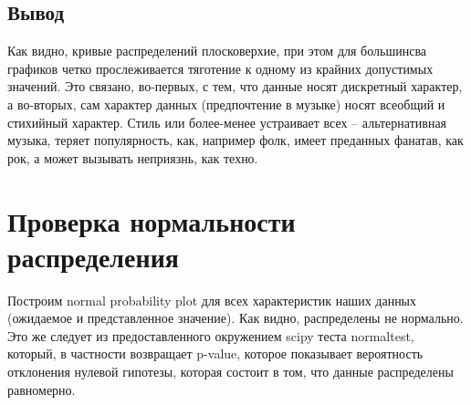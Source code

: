 \documentclass[11pt]{article}
\begin{document}
\subsection{Вывод}
Как видно, кривые распределений плосковерхие, при этом для большинсва графиков четко прослеживается 
тяготение к одному из крайних допустимых значений. Это связано, во-первых, с тем, что данные носят дискретный
характер, а во-вторых, сам характер данных (предпочтение в музыке) носят всеобщий и стихийный характер. Стиль или более-менее устраивает всех -- альтернативная музыка, теряет популярность, как, например фолк, имеет преданных фанатав, как рок,
а может вызывать неприязнь, как техно. 

\section{Проверка нормальности распределения}
Построим normal probability plot для всех характеристик наших данных (ожидаемое и представленное 
значение). Как видно, распределены не нормально. Это же следует из предоставленного окружением 
scipy теста normaltest, который, в частности возвращает p-value, которое показывает вероятность 
отклонения нулевой гипотезы, которая состоит в том, что данные распределены равномерно. 
\end{document}
